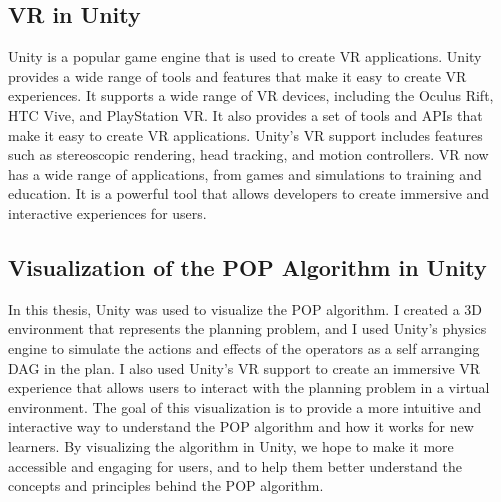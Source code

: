\subsection{\acf{VR} in Unity} \label{subsec:vr_in_unity}
Unity is a popular game engine that is used to create \ac{VR} applications. Unity provides a wide range of tools and features that make it easy to create \ac{VR} experiences. It supports a wide range of \ac{VR} devices, including the Oculus Rift, HTC Vive, and PlayStation \ac{VR}. It also provides a set of tools and APIs that make it easy to create \ac{VR} applications. Unity's \ac{VR} support includes features such as stereoscopic rendering, head tracking, and motion controllers. \acf{VR} now has a wide range of applications, from games and simulations to training and education. It is a powerful tool that allows developers to create immersive and interactive experiences for users.
\subsection{Visualization of the \acf{POP} Algorithm in Unity} \label{subsec:visualization_pop_unity}
In this thesis, Unity was used to visualize the \ac{POP} algorithm.
I created a 3D environment that represents the planning problem, and I used Unity's physics engine to simulate the actions and effects of the operators as a self arranging \ac{DAG} in the plan. I also used Unity's \ac{VR} support to create an immersive \ac{VR} experience that allows users to interact with the planning problem in a virtual environment. The goal of this visualization is to provide a more intuitive and interactive way to understand the \ac{POP} algorithm and how it works for new learners. By visualizing the algorithm in Unity, we hope to make it more accessible and engaging for users, and to help them better understand the concepts and principles behind the \ac{POP} algorithm.
